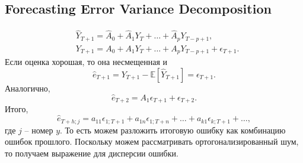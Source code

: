     \subsection[Декомпозиция дисперсии (FEVD)]{Forecasting Error Variance Decomposition}
        \begin{align*}
            & \hat Y_{T+1} = \hat A_0 + \hat A_1 Y_T + \dots + \hat A_p Y_{T-p+1}, \\
            &  Y_{T+1} =  A_0 +  A_1 Y_T + \dots +  A_p Y_{T-p+1} + \epsilon_{T+1}.
        \end{align*}
        Если оценка хорошая, то она несмещенная и 
        \begin{equation*}
            \hat e_{T+1} = Y_{T+1} - \mathbb{E}\left[\hat Y_{T+1}\right] = \epsilon_{T+1}.
        \end{equation*}
        Аналогично, 
        \begin{equation*}
            \hat e_{T+2} = A_1 \epsilon_{T+1} + \epsilon_{T+2}.
        \end{equation*}
        Итого, 
        \begin{equation*}
            \hat e_{T+h; j} = a_{11}\epsilon_{1;T+1} + a_{1n}\epsilon_{1 ; T+ n} + \dots + a_{k1}\epsilon_{k ; T+1 } + \dots,
        \end{equation*}
        где $j$ -- номер $y$. То есть можем разложить итоговую ошибку как комбинацию ошибок прошлого. Поскольку можем рассматривать ортогонализированный шум, то получаем выражение для дисперсии ошибки.


